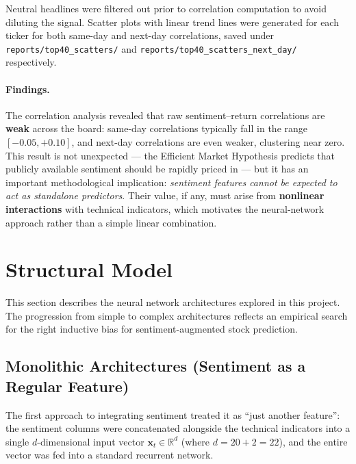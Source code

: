 Neutral headlines were filtered out prior to correlation computation to avoid
diluting the signal.  Scatter plots with linear trend lines were generated for
each ticker for both same-day and next-day correlations, saved under
\texttt{reports/top40\_scatters/} and \texttt{reports/top40\_scatters\_next\_day/}
respectively.

\paragraph{Findings.}
The correlation analysis revealed that raw sentiment--return correlations are
\textbf{weak} across the board: same-day correlations typically fall in the range
$[-0.05, +0.10]$, and next-day correlations are even weaker, clustering near
zero.  This result is not unexpected --- the Efficient Market Hypothesis predicts
that publicly available sentiment should be rapidly priced in --- but it has an
important methodological implication: \emph{sentiment features cannot be expected
to act as standalone predictors}.  Their value, if any, must arise from
\textbf{nonlinear interactions} with technical indicators, which motivates the
neural-network approach rather than a simple linear combination.

\section{Structural Model}
\label{sec:structural-model}

This section describes the neural network architectures explored in this
project.  The progression from simple to complex architectures reflects an
empirical search for the right inductive bias for sentiment-augmented stock
prediction.

\subsection{Monolithic Architectures (Sentiment as a Regular Feature)}
\label{sec:monolithic}

The first approach to integrating sentiment treated it as ``just another
feature'': the sentiment columns were concatenated alongside the technical
indicators into a single $d$-dimensional input vector $\mathbf{x}_t \in
\mathbb{R}^d$ (where $d = 20 + 2 = 22$), and the entire vector was fed into a
standard recurrent network.


